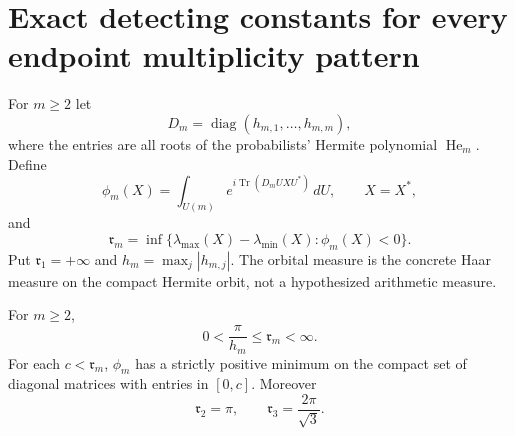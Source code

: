 \section{Exact detecting constants for every endpoint multiplicity pattern}
\label{sec:analytic-orbital-detection-constants}

\begin{definition}
For $m\ge2$ let
\[
 D_m=\operatorname{diag}(h_{m,1},\ldots,h_{m,m}),
\]
where the entries are all roots of the probabilists' Hermite polynomial
$\operatorname{He}_m$. Define
\[
 \phi_m(X)=\int_{U(m)}e^{i\operatorname{Tr}(D_mUXU^*)}\,dU,
                 \qquad X=X^*,
\]
and
\begin{equation}\label{eq:analytic-orbital-radius}
 \mathfrak r_m=
   \inf\{\lambda_{\max}(X)-\lambda_{\min}(X):\phi_m(X)<0\}.
\end{equation}
Put $\mathfrak r_1=+\infty$ and $h_m=\max_j|h_{m,j}|$.
The orbital measure is the concrete Haar measure on the compact
Hermite orbit, not a hypothesized arithmetic measure.
\end{definition}

\begin{lemma}
\label{lem:analytic-orbital-radius-properties}
For $m\ge2$,
\[
                  0<\frac\pi{h_m}\le\mathfrak r_m<\infty.
\]
For each $c<\mathfrak r_m$, $\phi_m$ has a strictly positive minimum
on the compact set of diagonal matrices with entries in $[0,c]$.
Moreover
\begin{equation}\label{eq:analytic-first-orbital-radii}
                   \mathfrak r_2=\pi,\qquad
                   \mathfrak r_3=\frac{2\pi}{\sqrt3}.
\end{equation}
\end{lemma}

